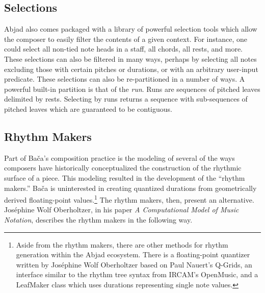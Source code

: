 \subsection{Selections}

Abjad also comes packaged with a library of powerful selection tools which allow the composer to easily filter the contents of a given context. For instance, one could select all non-tied note heads in a staff, all chords, all rests, and more. These selections can also be filtered in many ways, perhaps by selecting all notes excluding those with certain pitches or durations, or with an arbitrary user-input predicate. These selections can also be re-partitioned in a number of ways. A powerful built-in partition is that of the \textit{run}. Runs are sequences of pitched leaves delimited by rests. Selecting by runs returns a sequence with sub-sequences of pitched leaves which are guaranteed to be contiguous.

\subsection{Rhythm Makers}
\label{rmakers}
Part of Ba\v{c}a's composition practice is the modeling of several of the ways composers have historically conceptualized the construction of the rhythmic surface of a piece. This modeling resulted in the development of the ``rhythm makers.'' Ba\v{c}a is uninterested in creating quantized durations from geometrically derived floating-point values.\footnote{Aside from the rhythm makers, there are other methods for rhythm generation within the Abjad ecosystem. There is a floating-point quantizer written by Joséphine Wolf Oberholtzer based on Paul Nauert's Q-Grids, an interface similar to the rhythm tree syntax from IRCAM's OpenMusic, and a LeafMaker class which uses durations representing single note values.} The rhythm makers, then, present an alternative. Joséphine Wolf Oberholtzer, in his paper \textit{A Computational Model of Music Notation}, describes the rhythm makers in the following way.


